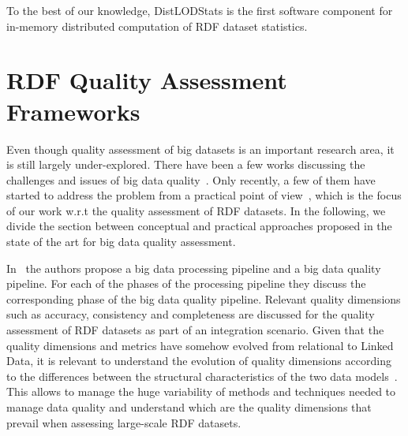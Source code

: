 To the best of our knowledge, DistLODStats is the first software component for in-memory distributed computation of RDF dataset statistics. 

\section{RDF Quality Assessment Frameworks}
Even though quality assessment of big datasets is an important research area, it is still largely under-explored. 
There have been a few works discussing the challenges and issues of big data quality~\cite{becker2015big,RaoG015,cai2015challenges}. 
Only recently, a few of them have started to address the problem from a practical point of view~\cite{debattista2016luzzu}, which is the focus of our work w.r.t the quality assessment of RDF datasets.
In the following, we divide the section between conceptual and practical approaches proposed in the state of the art for big data quality assessment.

In~\cite{CatarciSCD17} the authors propose a big data processing pipeline and a big data quality pipeline. 
For each of the phases of the processing pipeline they discuss the corresponding phase of the big data quality pipeline.
Relevant quality dimensions such as accuracy, consistency and completeness are discussed for the quality assessment of RDF datasets as part of an integration scenario.
Given that the quality dimensions and metrics have somehow evolved from relational to Linked Data,
it is relevant to understand the evolution of quality dimensions according to the differences between the structural characteristics of the two data models~\cite{BatiniRSV15}. 
This allows to manage the huge variability of methods and techniques needed to manage data quality and understand which are the quality dimensions that prevail when assessing large-scale RDF datasets.

